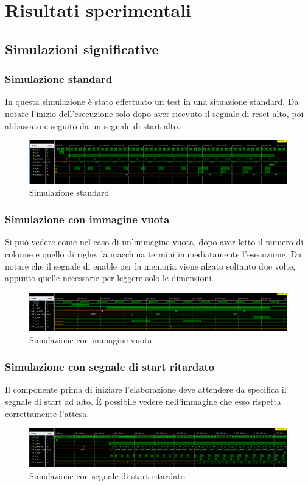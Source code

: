 \documentclass{article}
\begin{document}
\section{Risultati sperimentali}
\subsection{Simulazioni significative}
\subsubsection{Simulazione standard}
In questa simulazione è stato effettuato un test in una situazione standard. Da notare l'inizio dell'esecuzione solo dopo aver ricevuto il segnale di reset alto, poi abbassato e seguito da un segnale di start alto.
\begin{figure}[h]
    \includegraphics[width=\textwidth]{test-standard.png}
    \centering
    \caption{Simulazione standard}
\end{figure}

\subsubsection{Simulazione con immagine vuota}
Si può vedere come nel caso di un'immagine vuota, dopo aver letto il numero di colonne e quello di righe, la macchina termini immediatamente l'esecuzione. Da notare che il segnale di enable per la memoria viene alzato soltanto due volte, appunto quelle necessarie per leggere solo le dimensioni.
\begin{figure}[h]
    \includegraphics[width=\textwidth]{test-empty-image.png}
    \centering
    \caption{Simulazione con immagine vuota}
\end{figure}

\subsubsection{Simulazione con segnale di start ritardato}
Il componente prima di iniziare l'elaborazione deve attendere da specifica il segnale di start ad alto. È possibile vedere nell'immagine che esso rispetta correttamente l'attesa.
\begin{figure}[h]
    \includegraphics[width=\textwidth]{test-delayed-start.png}
    \centering
    \caption{Simulazione con segnale di start ritardato}
\end{figure}
\end{document}
